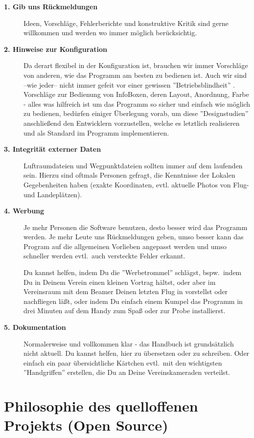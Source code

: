 \begin{description}
\item[{\bf 1. Gib uns Rückmeldungen}] Ideen, Vorschläge, Fehlerberichte und konstruktive Kritik sind gerne willkommen und werden
wo immer möglich berücksichtig.
\item[{\bf2. Hinweise zur Konfiguration}] Da \xc derart flexibel in der Konfiguration ist, brauchen wir immer Vorschläge von anderen, wie
das Programm am besten zu bedienen ist. Auch wir sind --wie jeder-- nicht immer gefeit vor einer gewissen ''Betriebsblindheit'' .
Vorschläge zur Bedienung von InfoBoxen, deren Layout, Anordnung, Farbe - alles was hilfreich ist um das Programm so sicher
und einfach wie möglich zu bedienen, bedürfen einiger Überlegung vorab, um diese ''Designstudien'' anschließend den Entwicklern
vorzustellen, welche es letztlich realisieren und als Standard im Programm implementieren.
\item[{\bf3. Integrität externer Daten}] Luftraumdateien und Wegpunktdateien sollten immer auf dem laufenden sein.
Hierzu sind oftmals Personen gefragt, die Kenntnisse der Lokalen Gegebenheiten haben (exakte Koordinaten, evtl. aktuelle Photos von Flug- und Landeplätzen).
\item[{\bf4. Werbung}]  Je mehr Personen die Software benutzen, desto besser wird das Programm werden. Je mehr Leute uns Rückmeldungen geben, umso
besser kann das Program auf die allgemeinen Vorlieben angepasst werden und umso schneller werden evtl.\ auch versteckte Fehler erkannt.

Du kannst helfen, indem Du die ''Werbetrommel'' schlägst, bspw.\ indem Du in Deinem Verein einen kleinen Vortrag hältst, oder aber im Vereinsraum mit
dem Beamer Deinen letzten Flug in \xc vorstellst oder nachfliegen läßt, oder indem Du einfach einem Kumpel das Programm in drei Minuten auf 
dem Handy zum Spaß oder zur Probe installierst.
\item[{\bf5. Dokumentation}]  Normalerweise und vollkommen klar - das Handbuch ist grundsätzlich nicht aktuell. Du kannst helfen, hier zu übersetzen oder zu 
schreiben. Oder einfach ein paar übersichtliche Kärtchen evtl.\ mit den wichtigsten ''Handgriffen'' erstellen, die Du an Deine Vereinskameraden 
verteilst.
\end{description}


\section{Philosophie des quelloffenen Projekts (Open Source)}

